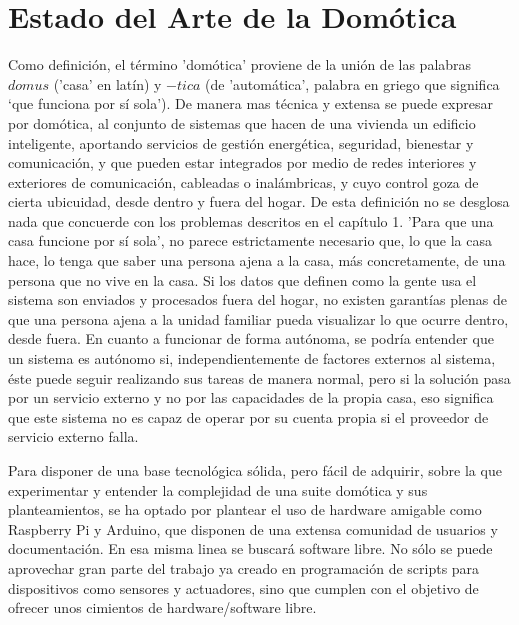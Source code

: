 \cleardoublepage

\chapter{Estado del Arte de la Domótica}
\label{ch:Capitulo2}

Como definición, el término 'domótica' proviene de la unión de las palabras $domus$ ('casa' en latín) y $-tica$ (de 'automática', palabra en griego que significa ‘que funciona por sí sola’). De manera mas técnica y extensa se puede expresar por domótica, al conjunto de sistemas que hacen de una vivienda un edificio inteligente, aportando servicios de gestión energética, seguridad, bienestar y comunicación, y que pueden estar integrados por medio de redes interiores y exteriores de comunicación, cableadas o inalámbricas, y cuyo control goza de cierta ubicuidad, desde dentro y fuera del hogar. De esta definición no se desglosa nada que concuerde con los problemas descritos en el capítulo 1. 'Para que una casa funcione por sí sola', no parece estrictamente necesario que, lo que la casa hace, lo tenga que saber una persona ajena a la casa, más concretamente, de una persona que no vive en la casa. Si los datos que definen como la gente usa el sistema son enviados y procesados fuera del hogar, no existen garantías plenas de que una persona ajena a la unidad familiar pueda visualizar lo que ocurre dentro, desde fuera. En cuanto a funcionar de forma autónoma, se podría entender que un sistema es autónomo si, independientemente de factores externos al sistema, éste puede seguir realizando sus tareas de manera normal, pero si la solución pasa por un servicio externo y no por las capacidades de la propia casa, eso significa que este sistema no es capaz de operar por su cuenta propia si el proveedor de servicio externo falla.

\vspace{1.5cm}

Para disponer de una base tecnológica sólida, pero fácil de adquirir, sobre la que experimentar y entender la complejidad de una suite domótica y sus planteamientos, se ha optado por plantear el uso de hardware amigable como Raspberry Pi y Arduino, que disponen de una extensa comunidad de usuarios y documentación. En esa misma linea se buscará software libre. No sólo se puede aprovechar gran parte del trabajo ya creado en programación de scripts para dispositivos como sensores y actuadores, sino que cumplen con el objetivo de ofrecer unos cimientos de hardware/software libre.

